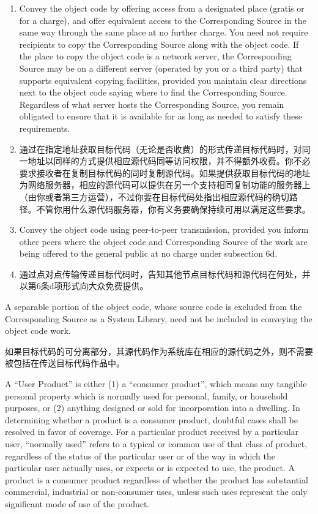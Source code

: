 \documentclass[11pt]{article}
\begin{document}
\begin{enumerate}
\begin{enumerate}
  \item Convey the object code by offering access from a designated
  place (gratis or for a charge), and offer equivalent access to the
  Corresponding Source in the same way through the same place at no
  further charge.  You need not require recipients to copy the
  Corresponding Source along with the object code.  If the place to
  copy the object code is a network server, the Corresponding Source
  may be on a different server (operated by you or a third party)
  that supports equivalent copying facilities, provided you maintain
  clear directions next to the object code saying where to find the
  Corresponding Source.  Regardless of what server hosts the
  Corresponding Source, you remain obligated to ensure that it is
  available for as long as needed to satisfy these requirements.

  \item 通过在指定地址获取目标代码（无论是否收费）的形式传递目标代码时，对同一地址以同样的方式提供相应源代码同等访问权限，并不得额外收费。你不必要求接收者在复制目标代码的同时复制源代码。如果提供获取目标代码的地址为网络服务器，相应的源代码可以提供在另一个支持相同复制功能的服务器上（由你或者第三方运营），不过你要在目标代码处指出相应源代码的确切路径。不管你用什么源代码服务器，你有义务要确保持续可用以满足这些要求。

  \item Convey the object code using peer-to-peer transmission, provided
  you inform other peers where the object code and Corresponding
  Source of the work are being offered to the general public at no
  charge under subsection 6d.

  \item 通过点对点传输传递目标代码时，告知其他节点目标代码和源代码在何处，并以第6条d项形式向大众免费提供。
  
\end{enumerate}

A separable portion of the object code, whose source code is excluded
from the Corresponding Source as a System Library, need not be
included in conveying the object code work.

如果目标代码的可分离部分，其源代码作为系统库在相应的源代码之外，则不需要被包括在传送目标代码作品中。

A ``User Product'' is either (1) a ``consumer product'', which means any
tangible personal property which is normally used for personal, family,
or household purposes, or (2) anything designed or sold for incorporation
into a dwelling.  In determining whether a product is a consumer product,
doubtful cases shall be resolved in favor of coverage.  For a particular
product received by a particular user, ``normally used'' refers to a
typical or common use of that class of product, regardless of the status
of the particular user or of the way in which the particular user
actually uses, or expects or is expected to use, the product.  A product
is a consumer product regardless of whether the product has substantial
commercial, industrial or non-consumer uses, unless such uses represent
the only significant mode of use of the product.


\end{enumerate}
\end{document}
